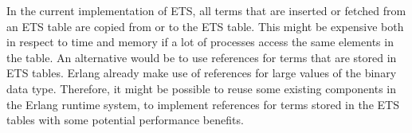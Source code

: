 \documentclass[aps,pre,preprint,nofootinbib]{revtex4}
\begin{document}
  In the current implementation of ETS, all terms that are inserted or fetched from an ETS table are copied from or to the ETS table.
  This might be expensive both in respect to time and memory if a lot of processes access the same elements in the table.
  An alternative would be to use references for terms that are stored in ETS tables. 
  Erlang already make use of references for large values of the binary data type.
  Therefore, it might be possible to reuse some existing components in the Erlang runtime system, to implement references for terms stored in the ETS tables with some potential performance benefits.
  
  

  

  


  
\end{document}
